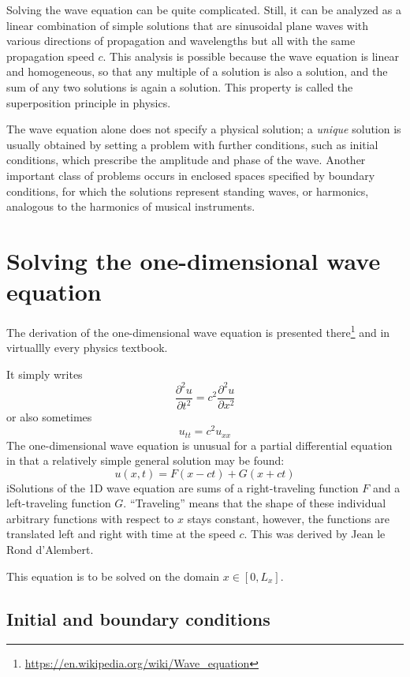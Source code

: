 Solving the wave equation can be quite complicated. Still, it can be analyzed 
as a linear combination of simple solutions that are sinusoidal plane waves 
with various directions of propagation and wavelengths but all with the same propagation 
speed $c$. This analysis is possible because the wave equation is linear and homogeneous, 
so that any multiple of a solution is also a solution, and the sum of any two solutions 
is again a solution. This property is called the superposition principle in physics.


The wave equation alone does not specify a physical solution; 
a {\it unique} solution is usually obtained by setting a problem with further 
conditions, such as initial conditions, which prescribe the amplitude and phase of the wave. 
Another important class of problems occurs in enclosed spaces specified by boundary 
conditions, for which the solutions represent standing waves, or harmonics, analogous 
to the harmonics of musical instruments. 



\section{Solving the one-dimensional wave equation}

The derivation of the one-dimensional wave equation is presented 
there\footnote{\url{https://en.wikipedia.org/wiki/Wave_equation}} 
and in virtuallly every physics textbook.

It simply writes
\[
\frac{\partial^2 u}{\partial t^2} = c^2 
\frac{\partial^2 u}{\partial x^2} 
\]
or also sometimes
\[
u_{tt} = c^2 u_{xx}
\]
The one-dimensional wave equation is unusual for a partial differential equation 
in that a relatively simple general solution may be found:
\[
u(x,t)=F(x-ct)+G(x+ct)
\]
iSolutions of the 1D wave equation are sums of a right-traveling function 
$F$ and a left-traveling function $G$. 
``Traveling'' means that the shape of these individual arbitrary 
functions with respect to $x$ stays constant, however, the functions are 
translated left and right with time at the speed $c$. 
This was derived by Jean le Rond d'Alembert.

This equation is to be solved on the domain $x \in [0,L_x]$.

\subsection{Initial and boundary conditions}

